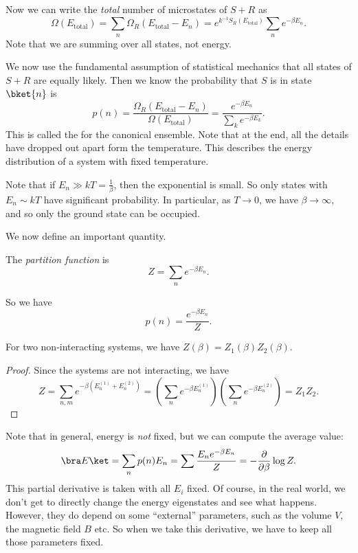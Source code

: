 \documentclass[a4paper]{article}
\begin{document}
Now we can write the \emph{total} number of microstates of $S + R$ as
\[
  \Omega(E_{\mathrm{total}}) = \sum_n \Omega_R(E_{\mathrm{total}} - E_n) = e^{k^{-1} S_R(E_{\mathrm{total}})} \sum_n e^{-\beta E_n}.
\]
Note that we are summing over all states, not energy.

We now use the fundamental assumption of statistical mechanics that all states of $S + R$ are equally likely. Then we know the probability that $S$ is in state $\bket{n}$ is
\[
  p(n) =\frac{\Omega_R(E_{\mathrm{total}} - E_n)}{\Omega(E_{\mathrm{total}})} = \frac{e^{-\beta E_n}}{\sum_k e^{-\beta E_k}}.
\]
This is called the  for the canonical ensemble. Note that at the end, all the details have dropped out apart form the temperature. This describes the energy distribution of a system with fixed temperature.

Note that if $E_n \gg kT = \frac{1}{\beta}$, then the exponential is small. So only states with $E_n \sim kT$ have significant probability. In particular, as $T \to 0$, we have $\beta \to \infty$, and so only the ground state can be occupied.

We now define an important quantity.
\begin{defi}
  The \emph{partition function} is
  \[
    Z = \sum_n e^{-\beta E_n}.
  \]
\end{defi}
So we have
\[
  p(n) = \frac{e^{-\beta E_n}}{Z}.
\]
\begin{prop}
  For two non-interacting systems, we have $Z(\beta) = Z_1(\beta) Z_2(\beta)$.
\end{prop}

\begin{proof}
  Since the systems are not interacting, we have
  \[
    Z = \sum_{n, m} e^{-\beta (E_n^{(1)} + E_n^{(2)})} = \left(\sum_n e^{-\beta E_n^{(1)}}\right)\left(\sum_n e^{-\beta E_n^{(2)}}\right) = Z_1 Z_2.
  \]
\end{proof}

Note that in general, energy is \emph{not} fixed, but we can compute the average value:
\[
  \bra E\ket = \sum_n p(n) E_n = \sum \frac{E_n e^{-\beta E_n}}{Z} = -\frac{\partial}{\partial \beta} \log Z.
\]
This partial derivative is taken with all $E_i$ fixed. Of course, in the real world, we don't get to directly change the energy eigenstates and see what happens. However, they do depend on some ``external'' parameters, such as the volume $V$, the magnetic field $B$ etc. So when we take this derivative, we have to keep all those parameters fixed.
\end{document}
